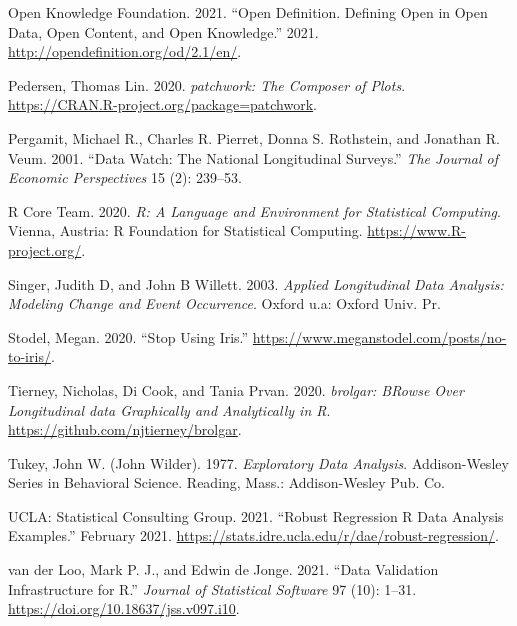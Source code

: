 \documentclass{article}
\newlength{\cslhangindent}
\newlength{\cslentryspacingunit} %
\newenvironment{CSLReferences}[2] %
 {%
  \setlength{\parindent}{0pt}
  \ifodd #1
  \let\oldpar\par
  \def\par{\hangindent=\cslhangindent\oldpar}
  \fi
  \setlength{\parskip}{#2\cslentryspacingunit}
 }%
 {}
\begin{document}
\begin{CSLReferences}{1}{0}
\leavevmode{}%
Open Knowledge Foundation. 2021. {``Open Definition. Defining Open in Open Data, Open Content, and Open Knowledge.''} 2021. \url{http://opendefinition.org/od/2.1/en/}.

\leavevmode{}%
Pedersen, Thomas Lin. 2020. \emph{{patchwork: The Composer of Plots}}. \url{https://CRAN.R-project.org/package=patchwork}.

\leavevmode{}%
Pergamit, Michael R., Charles R. Pierret, Donna S. Rothstein, and Jonathan R. Veum. 2001. {``Data Watch: The National Longitudinal Surveys.''} \emph{The Journal of Economic Perspectives} 15 (2): 239--53.

\leavevmode{}%
R Core Team. 2020. \emph{R: A Language and Environment for Statistical Computing}. Vienna, Austria: R Foundation for Statistical Computing. \url{https://www.R-project.org/}.

\leavevmode{}%
Singer, Judith D, and John B Willett. 2003. \emph{Applied Longitudinal Data Analysis: Modeling Change and Event Occurrence}. Oxford u.a: Oxford Univ. Pr.

\leavevmode{}%
Stodel, Megan. 2020. {``Stop Using Iris.''} \url{https://www.meganstodel.com/posts/no-to-iris/}.

\leavevmode{}%
Tierney, Nicholas, Di Cook, and Tania Prvan. 2020. \emph{{brolgar: BRowse Over Longitudinal data Graphically and Analytically in R}}. \url{https://github.com/njtierney/brolgar}.

\leavevmode{}%
Tukey, John W. (John Wilder). 1977. \emph{Exploratory Data Analysis}. Addison-Wesley Series in Behavioral Science. Reading, Mass.: Addison-Wesley Pub. Co.

\leavevmode{}%
UCLA: Statistical Consulting Group. 2021. {``{Robust Regression \textbar{} R Data Analysis Examples}.''} February 2021. \url{https://stats.idre.ucla.edu/r/dae/robust-regression/}.

\leavevmode{}%
van der Loo, Mark P. J., and Edwin de Jonge. 2021. {``Data Validation Infrastructure for {R}.''} \emph{Journal of Statistical Software} 97 (10): 1--31. \url{https://doi.org/10.18637/jss.v097.i10}.


\end{CSLReferences}
\end{document}
